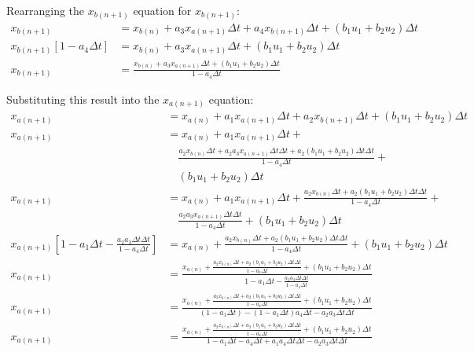 \documentclass[11pt]{article}
\begin{document}
Rearranging the $x_{b(n+1)}$ equation for $x_{b(n+1)}$:
\begin{subequations}
  \begin{align}
    x_{b(n+1)} &= x_{b(n)} +  a_3 x_{a(n+1)}\Delta t + a_4 x_{b(n+1)}\Delta t + (b_1 u_1 + b_2 u_2)\Delta t \\
    x_{b(n+1)}\left[1 - a_4\Delta t\right] &= x_{b(n)} +  a_3 x_{a(n+1)}\Delta t + (b_1 u_1 + b_2 u_2)\Delta t \\
    x_{b(n+1)} &= \frac{x_{b(n)} +  a_3 x_{a(n+1)}\Delta t + (b_1 u_1 + b_2 u_2)\Delta t}{1 - a_4\Delta t}
  \end{align}
\end{subequations}

Substituting this result into the $x_{a(n+1)}$ equation:
\begin{subequations}
  \begin{align}
    x_{a(n+1)} &= x_{a(n)} +  a_1 x_{a(n+1)}\Delta t + a_2 x_{b(n+1)}\Delta t + (b_1 u_1 + b_2 u_2)\Delta t \\
    x_{a(n+1)} &= x_{a(n)} +  a_1 x_{a(n+1)}\Delta t + \\ \nonumber
    &\quad \frac{a_2 x_{b(n)} \Delta t +  a_2 a_3 x_{a(n+1)}\Delta t\Delta t + a_2(b_1 u_1 + b_2 u_2)\Delta t\Delta t}{1 - a_4\Delta t} + \\ \nonumber
    &\quad (b_1 u_1 + b_2 u_2)\Delta t \\
    x_{a(n+1)} &= x_{a(n)} +  a_1 x_{a(n+1)}\Delta t + \frac{a_2 x_{b(n)} \Delta t + a_2(b_1 u_1 + b_2 u_2)\Delta t\Delta t}{1 - a_4\Delta t} + \\ \nonumber
    &\quad \frac{a_2 a_3 x_{a(n+1)}\Delta t\Delta t}{1 - a_4\Delta t} + (b_1 u_1 + b_2 u_2)\Delta t \\
    x_{a(n+1)}\left[1 - a_1\Delta t - \frac{a_2 a_3 \Delta t\Delta t}{1 - a_4\Delta t}\right] &= x_{a(n)} + \frac{a_2 x_{b(n)} \Delta t + a_2(b_1 u_1 + b_2 u_2)\Delta t\Delta t}{1 - a_4\Delta t} + (b_1 u_1 + b_2 u_2)\Delta t \\
    x_{a(n+1)} &= \frac{x_{a(n)} + \frac{a_2 x_{b(n)} \Delta t + a_2(b_1 u_1 + b_2 u_2)\Delta t\Delta t}{1 - a_4\Delta t} + (b_1 u_1 + b_2 u_2)\Delta t}{1 - a_1\Delta t - \frac{a_2 a_3 \Delta t\Delta t}{1 - a_4\Delta t}} \\
    x_{a(n+1)} &= \frac{x_{a(n)} + \frac{a_2 x_{b(n)} \Delta t + a_2(b_1 u_1 + b_2 u_2)\Delta t\Delta t}{1 - a_4\Delta t} + (b_1 u_1 + b_2 u_2)\Delta t}{(1 - a_1\Delta t) - (1 - a_1\Delta t)a_4\Delta t - a_2 a_3 \Delta t\Delta t} \\
    x_{a(n+1)} &= \frac{x_{a(n)} + \frac{a_2 x_{b(n)} \Delta t + a_2(b_1 u_1 + b_2 u_2)\Delta t\Delta t}{1 - a_4\Delta t} + (b_1 u_1 + b_2 u_2)\Delta t}{1 - a_1\Delta t - a_4\Delta t + a_1a_4\Delta t\Delta t - a_2 a_3 \Delta t\Delta t} \\

\end{align}
\end{subequations}
\end{document}
